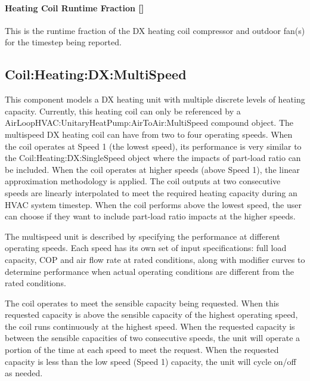 \paragraph{\texorpdfstring{Heating Coil Runtime Fraction {[]}}{Heating Coil Runtime Fraction }}\label{heating-coil-runtime-fraction-4}

This is the runtime fraction of the DX heating coil compressor and outdoor fan(s) for the timestep being reported.

\subsection{Coil:Heating:DX:MultiSpeed}\label{coilheatingdxmultispeed}

This component models a DX heating unit with multiple discrete levels of heating capacity. Currently, this heating coil can only be referenced by a AirLoopHVAC:UnitaryHeatPump:AirToAir:MultiSpeed compound object. The multispeed DX heating coil can have from two to four operating speeds. When the coil operates at Speed 1 (the lowest speed), its performance is very similar to the Coil:Heating:DX:SingleSpeed object where the impacts of part-load ratio can be included. When the coil operates at higher speeds (above Speed 1), the linear approximation methodology is applied. The coil outputs at two consecutive speeds are linearly interpolated to meet the required heating capacity during an HVAC system timestep. When the coil performs above the lowest speed, the user can choose if they want to include part-load ratio impacts at the higher speeds.

The multispeed unit is described by specifying the performance at different operating speeds. Each speed has its own set of input specifications: full load capacity, COP and air flow rate at rated conditions, along with modifier curves to determine performance when actual operating conditions are different from the rated conditions.

The coil operates to meet the sensible capacity being requested. When this requested capacity is above the sensible capacity of the highest operating speed, the coil runs continuously at the highest speed. When the requested capacity is between the sensible capacities of two consecutive speeds, the unit will operate a portion of the time at each speed to meet the request. When the requested capacity is less than the low speed (Speed 1) capacity, the unit will cycle on/off as needed.

